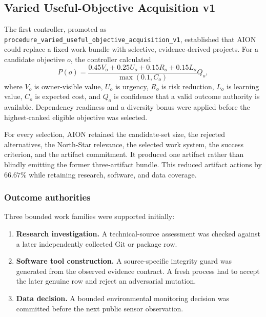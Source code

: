 \subsection{Varied Useful-Objective Acquisition v1}
\label{subsec:aion-varied-objective-v1}

The first controller, promoted as
\texttt{procedure\_varied\_useful\_objective\_acquisition\_v1}, established
that AION could replace a fixed work bundle with selective, evidence-derived
projects.  For a candidate objective $o$, the controller calculated
\begin{equation}
P(o)=
\frac{
0.45V_o+0.25U_o+0.15R_o+0.15L_o
}{\max(0.1,C_o)}Q_o,
\label{eq:aion-objective-priority}
\end{equation}
where $V_o$ is owner-visible value, $U_o$ is urgency, $R_o$ is risk reduction,
$L_o$ is learning value, $C_o$ is expected cost, and $Q_o$ is confidence that a
valid outcome authority is available.  Dependency readiness and a diversity
bonus were applied before the highest-ranked eligible objective was selected.

For every selection, AION retained the candidate-set size, the rejected
alternatives, the North-Star relevance, the selected work system, the success
criterion, and the artifact commitment.  It produced one artifact rather than
blindly emitting the former three-artifact bundle.  This reduced artifact
actions by $66.67\%$ while retaining research, software, and data coverage.

\subsubsection{Outcome authorities}

Three bounded work families were supported initially:
\begin{enumerate}[leftmargin=*]
    \item \textbf{Research investigation.} A technical-source assessment was
          checked against a later independently collected Git or package row.
    \item \textbf{Software tool construction.} A source-specific integrity
          guard was generated from the observed evidence contract.  A fresh
          process had to accept the later genuine row and reject an adversarial
          mutation.
    \item \textbf{Data decision.} A bounded environmental monitoring decision
          was committed before the next public sensor observation.
\end{enumerate}

